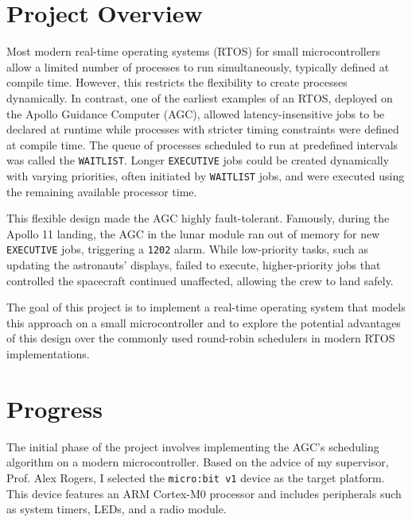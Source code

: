 \documentclass[oxford]{ahsan}
\title{\vspace{-3em}{Part C Project Report}\vspace{-1em}}
\begin{document}
\maketitle
\vspace{-3em}
\section{Project Overview}

Most modern real-time operating systems (RTOS) for small microcontrollers allow a
limited number of processes to run simultaneously, typically defined at compile time.
However, this restricts the flexibility to create processes dynamically. In contrast,
one of the earliest examples of an RTOS, deployed on the Apollo Guidance Computer
(AGC), allowed latency-insensitive jobs to be declared at runtime while processes with
stricter timing constraints were defined at compile time. The queue of processes
scheduled to run at predefined intervals was called the \texttt{WAITLIST}. Longer
\texttt{EXECUTIVE} jobs could be created dynamically with varying priorities, often
initiated by \texttt{WAITLIST} jobs, and were executed using the remaining available
processor time.

This flexible design made the AGC highly fault-tolerant. Famously, during the Apollo 11
landing, the AGC in the lunar module ran out of memory for new \texttt{EXECUTIVE} jobs,
triggering a \texttt{1202} alarm. While low-priority tasks, such as updating the
astronauts' displays, failed to execute, higher-priority jobs that controlled the
spacecraft continued unaffected, allowing the crew to land safely.

The goal of this project is to implement a real-time operating system that models this
approach on a small microcontroller and to explore the potential advantages of this
design over the commonly used round-robin schedulers in modern RTOS implementations.

\section{Progress}

The initial phase of the project involves implementing the AGC's scheduling algorithm
on a modern microcontroller. Based on the advice of my supervisor, Prof. Alex Rogers, I
selected the \texttt{micro:bit v1} device as the target platform. This device features
an ARM Cortex-M0 processor and includes peripherals such as system timers, LEDs, and a
radio module.
\end{document}

